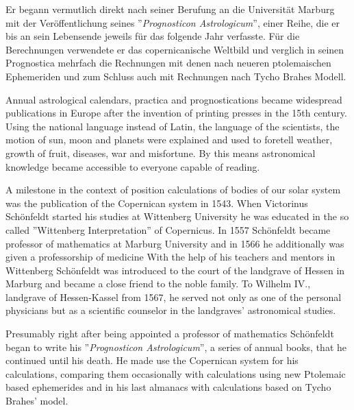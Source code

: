 \documentclass[12pt]{article}
\begin{document}
Er begann vermutlich direkt nach seiner Berufung an die Universität Marburg mit der Veröffentlichung seines ''\emph{Prognosticon Astrologicum}'', einer Reihe, die er bis an sein Lebensende jeweils für das folgende Jahr verfasste. Für die Berechnungen verwendete er das copernicanische Weltbild und verglich in seinen Prognostica mehrfach die Rechnungen mit denen
nach neueren ptolemaischen Ephemeriden und zum Schluss auch mit Rechnungen nach Tycho Brahes Modell. 

	
\vspace{5mm}

Annual astrological calendars, practica and prognostications became widespread publications in Europe after the invention of printing presses in the 15th century. Using the national language instead of Latin, the language of the scientists, the motion of sun, moon and planets were explained and used to foretell weather, growth of fruit, diseases,  war and misfortune. By this means astronomical knowledge became accessible to everyone capable of reading.

A milestone in the context of position calculations of bodies of our solar system was the publication of the Copernican system in 1543. When Victorinus Schönfeldt started his studies at Wittenberg University he was educated in the so called ''Wittenberg Interpretation'' of Copernicus. In 1557 Schönfeldt became professor of mathematics at Marburg University and in 1566 he additionally was given a professorship of medicine With the help of his teachers and mentors in Wittenberg Schönfeldt was introduced to the court of the landgrave of Hessen in Marburg and became a close friend to the noble family. To  Wilhelm IV., landgrave of Hessen-Kassel from 1567, he served not only as one of the personal physicians but as a scientific counselor in the landgraves' astronomical studies.

Presumably right after being appointed a professor of mathematics Schönfeldt began to write his ''\emph{Prognosticon Astrologicum}'', a series of annual books, that he continued until his death. He made use the Copernican system for his calculations, comparing them occasionally with calculations using new Ptolemaic based ephemerides and in his last almanacs with calculations based on Tycho Brahes' model.




\end{document}
